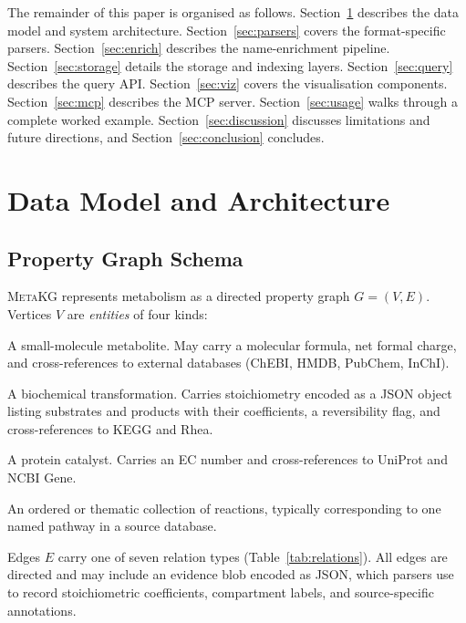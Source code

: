 \documentclass[10pt]{article}
\begin{document}
The remainder of this paper is organised as follows. Section~\ref{sec:design}
describes the data model and system architecture. Section~\ref{sec:parsers}
covers the format-specific parsers. Section~\ref{sec:enrich} describes the
name-enrichment pipeline. Section~\ref{sec:storage} details the storage and
indexing layers. Section~\ref{sec:query} describes the query API.
Section~\ref{sec:viz} covers the visualisation components.
Section~\ref{sec:mcp} describes the MCP server. Section~\ref{sec:usage}
walks through a complete worked example. Section~\ref{sec:discussion}
discusses limitations and future directions, and Section~\ref{sec:conclusion}
concludes.

\section{Data Model and Architecture}
\label{sec:design}

\subsection{Property Graph Schema}

\textsc{MetaKG} represents metabolism as a directed property graph
$G = (V, E)$. Vertices $V$ are \emph{entities} of four kinds:

\begin{description}[leftmargin=*, itemsep=2pt]
  \item[\texttt{compound}] A small-molecule metabolite. May carry a molecular
    formula, net formal charge, and cross-references to external databases
    (ChEBI, HMDB, PubChem, InChI).
  \item[\texttt{reaction}] A biochemical transformation. Carries stoichiometry
    encoded as a JSON object listing substrates and products with their
    coefficients, a reversibility flag, and cross-references to KEGG and Rhea.
  \item[\texttt{enzyme}] A protein catalyst. Carries an EC number and
    cross-references to UniProt and NCBI Gene.
  \item[\texttt{pathway}] An ordered or thematic collection of reactions,
    typically corresponding to one named pathway in a source database.
\end{description}

Edges $E$ carry one of seven relation types (Table~\ref{tab:relations}).
All edges are directed and may include an evidence blob encoded as JSON,
which parsers use to record stoichiometric coefficients, compartment labels,
and source-specific annotations.
\end{document}
